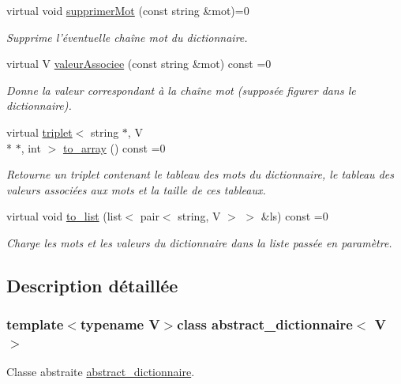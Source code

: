 \begin{DoxyCompactItemize}
virtual void \hyperlink{classabstract__dictionnaire_a7063c0c484fe9eabecb0ddb268951823}{supprimer\-Mot} (const string \&mot)=0
\begin{DoxyCompactList}\small\item\em Supprime l'éventuelle chaîne mot du dictionnaire. \end{DoxyCompactList}\item 
virtual V \hyperlink{classabstract__dictionnaire_abf2426d66e5499582dc4dc4fe5eeb1c3}{valeur\-Associee} (const string \&mot) const =0
\begin{DoxyCompactList}\small\item\em Donne la valeur correspondant à la chaîne mot (supposée figurer dans le dictionnaire). \end{DoxyCompactList}\item 
virtual \hyperlink{structtriplet}{triplet}$<$ string $\ast$, V \\*
$\ast$, int $>$ \hyperlink{classabstract__dictionnaire_a0b04fb9d2062846f5c9bdc8c7742538f}{to\-\_\-array} () const =0
\begin{DoxyCompactList}\small\item\em Retourne un triplet contenant le tableau des mots du dictionnaire, le tableau des valeurs associées aux mots et la taille de ces tableaux. \end{DoxyCompactList}\item 
virtual void \hyperlink{classabstract__dictionnaire_a0bebd25d66714c37c11f53f0797b2ffd}{to\-\_\-list} (list$<$ pair$<$ string, V $>$ $>$ \&ls) const =0
\begin{DoxyCompactList}\small\item\em Charge les mots et les valeurs du dictionnaire dans la liste passée en paramètre. \end{DoxyCompactList}\end{DoxyCompactItemize}


\subsection{Description détaillée}
\subsubsection*{template$<$typename V$>$class abstract\-\_\-dictionnaire$<$ V $>$}

Classe abstraite \hyperlink{classabstract__dictionnaire}{abstract\-\_\-dictionnaire}. 

